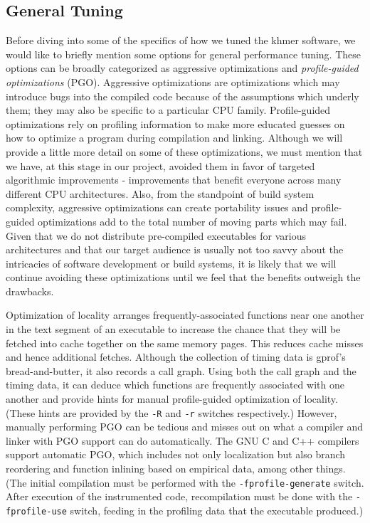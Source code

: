 \documentclass{article}
\begin{document}
\subsection{General Tuning}

Before diving into some of the specifics of how we tuned the khmer software, we would like to briefly mention some options for general performance tuning. These options can be broadly categorized as aggressive optimizations and \textit{profile-guided optimizations} (PGO). Aggressive optimizations are optimizations which may introduce bugs into the compiled code because of the assumptions which underly them; they may also be specific to a particular CPU family. Profile-guided optimizations rely on profiling information to make more educated guesses on how to optimize a program during compilation and linking. Although we will provide a little more detail on some of these optimizations, we must mention that we have, at this stage in our project, avoided them in favor of targeted algorithmic improvements - improvements that benefit everyone across many different CPU architectures. Also, from the standpoint of build system complexity, aggressive optimizations can create portability issues and profile-guided optimizations add to the total number of moving parts which may fail. Given that we do not distribute pre-compiled executables for various architectures and that our target audience is usually not too savvy about the intricacies of software development or build systems, it is likely that we will continue avoiding these optimizations until we feel that the benefits outweigh the drawbacks.


Optimization of locality arranges frequently-associated functions near one another in the text segment of an executable to increase the chance that they will be fetched into cache together on the same memory pages. This reduces cache misses and hence additional fetches. Although the collection of timing data is gprof's bread-and-butter, it also records a call graph. Using both the call graph and the timing data, it can deduce which functions are frequently associated with one another and provide hints for manual profile-guided optimization of locality. (These hints are provided by the \texttt{-R} and \texttt{-r} switches respectively.) However, manually performing PGO can be tedious and misses out on what a compiler and linker with PGO support can do automatically. The GNU C and C++ compilers support automatic PGO, which includes not only localization but also branch reordering and function inlining based on empirical data, among other things. (The initial compilation must be performed with the \texttt{-fprofile-generate} switch. After execution of the instrumented code, recompilation must be done with the \texttt{-fprofile-use} switch, feeding in the profiling data that the executable produced.)
\end{document}
